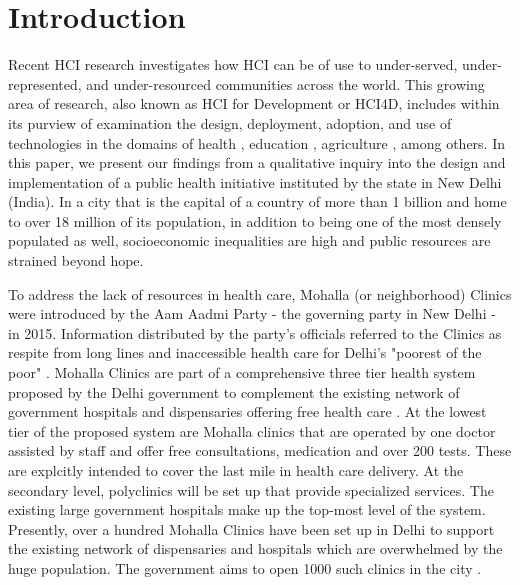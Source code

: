 \section{Introduction}
\begin{comment}
High level overview of the phenomenon you are studying. Should be something the reader can immediately get behind and hook themselves to. 
Now carry the reader through your flow. Draw their focus to the more narrow context in which you did your work.  
“In this paper, we focus on…” Give the high level description of your research.
“This paper is structured as follows.” Give the outline. When you mention the discussion, also mention the main findings of the discussion.
\end{comment}

Recent HCI research investigates how HCI can be of use to under-served, under-represented, and under-resourced communities across the world. This growing area of research, also known as HCI for Development or HCI4D, includes within its purview of examination the design, deployment, adoption, and use of technologies in the domains of health \cite{PH-CHI;TP}, education \cite{Kam}, agriculture \cite{Patel}, among others. In this paper, we present our findings from a qualitative inquiry into the design and implementation of a public health initiative instituted by the state in New Delhi (India). In a city that is the capital of a country of more than 1 billion and home to over 18 million of its population, in addition to being one of the most densely populated as well, socioeconomic inequalities are high and public resources are strained beyond hope. 

To address the lack of resources in health care, Mohalla (or neighborhood) Clinics were introduced by the Aam Aadmi Party - the governing party in New Delhi - in 2015. Information distributed by the party's officials referred to the Clinics as respite from long lines and inaccessible health care for Delhi's "poorest of the poor" \cite{AAPpressrelease}. Mohalla Clinics are part of a comprehensive three tier health system proposed by the Delhi government to complement the existing network of government hospitals and dispensaries offering free health care  \cite{article}. At the lowest tier of the proposed system are Mohalla clinics  that are operated by one doctor assisted by staff and offer free consultations, medication and over 200 tests. These are explcitly intended to cover the last mile in health care delivery. At the secondary level, polyclinics will be set up that provide specialized services. The existing large government hospitals make up the top-most level of the system. Presently, over a hundred Mohalla Clinics have been set up in Delhi to support the existing network of dispensaries and hospitals which are overwhelmed by the huge population. The government aims to open 1000 such clinics in the city \cite{?}.


